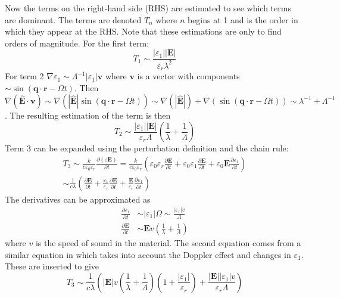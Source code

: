 \documentclass[10pt,a4paper,draft]{scrartcl}
\begin{document}
	Now the terms on the right-hand side (RHS) are estimated to see which terms are dominant. The terms are denoted $T_n$ where $n$ begins at 1 and is the order in which they appear at the RHS. Note that these estimations are only to find orders of magnitude. For the first term:
	\begin{equation*}
		T_1 \sim \frac{|\varepsilon_1| |\bm{E}|}{\varepsilon_r \lambda^2}
	\end{equation*}
	For term 2 $\nabla \varepsilon_1 \sim \Lambda^{-1} |\varepsilon_1| \bm{v}$ where $\bm{v}$ is a vector with components $\sim \sin(\bm{q} \cdot \bm{r} - \Omega t)$. Then $\nabla (\bm{\hat{E}} \cdot \bm{v}) \sim \nabla(|\bm{\hat{E}}| \sin(\bm{q} \cdot \bm{r} - \Omega t)) \sim \nabla(|\bm{\hat{E}}|) + \nabla(\sin(\bm{q} \cdot \bm{r} - \Omega t)) \sim \lambda^{-1} + \Lambda^{-1}$. The resulting estimation of the term is then
	\begin{equation*}
		T_2 \sim \frac{|\varepsilon_1| |\bm{E}|}{\varepsilon_r \Lambda} \left( \frac{1}{\lambda} + \frac{1}{\Lambda} \right)
	\end{equation*}
	Term 3 can be expanded using the perturbation definition and the chain rule:
	\begin{multline*}
		T_3 \sim \frac{k}{c\varepsilon_0\varepsilon_r} \frac{\partial (\varepsilon \bm{E})}{\partial t} = \frac{k}{c\varepsilon_0\varepsilon_r} \left( \varepsilon_0\varepsilon_r \frac{\partial \bm{E}}{\partial t} + \varepsilon_0\varepsilon_1 \frac{\partial \bm{E}}{\partial t} + \varepsilon_0\bm{E} \frac{\partial \varepsilon_1}{\partial t}\right) \\
		\sim \frac{1}{c\lambda} \left( \frac{\partial \bm{E}}{\partial t} + \frac{\varepsilon_1}{\varepsilon_r} \frac{\partial \bm{E}}{\partial t} + \frac{\bm{E}}{\varepsilon_r} \frac{\partial \varepsilon_1}{\partial t} \right)
	\end{multline*}
	The derivatives can be approximated as
	\begin{align*}
		\frac{\partial \varepsilon_1}{\partial t} &\sim |\varepsilon_1|\Omega \sim \frac{|\varepsilon_1| v}{\Lambda} \\
		\frac{\partial \bm{E}}{\partial t} &\sim \bm{E} v \left( \frac{1}{\lambda} + \frac{1}{\Lambda} \right)
	\end{align*}
	where $v$ is the speed of sound in the material. The second equation comes from a similar equation in \cite{Tatarskii1971} which takes into account the Doppler effect and changes in $\varepsilon_1$. These are inserted to give
	\begin{equation*}
		T_3 \sim \frac{1}{c\lambda} \left( |\bm{E}| v \left( \frac{1}{\lambda} + \frac{1}{\Lambda} \right) \left( 1 + \frac{|\varepsilon_1|}{\varepsilon_r} \right) + \frac{|\bm{E}| |\varepsilon_1| v}{\varepsilon_r \Lambda} \right)
	\end{equation*}
	
\end{document}
